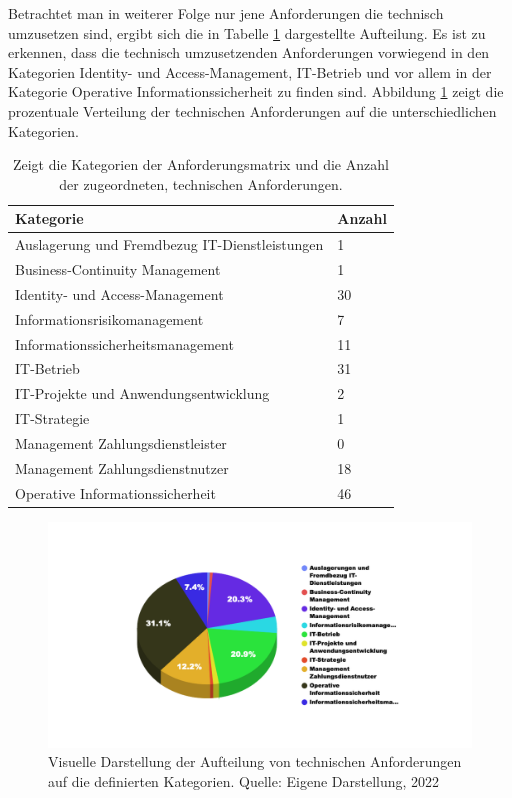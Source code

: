 \bigbreak
Betrachtet man in weiterer Folge nur jene Anforderungen die technisch umzusetzen sind, ergibt sich die in Tabelle \ref{table:kategorien_technisch} dargestellte Aufteilung. Es ist zu erkennen, dass die technisch umzusetzenden Anforderungen vorwiegend in den Kategorien \glqq{}Identity- und Access-Management\grqq{}, \glqq{}IT-Betrieb\grqq{} und vor allem in der Kategorie \glqq{}Operative Informationssicherheit\grqq{} zu finden sind. Abbildung \ref{fig:kategorien_technisch_aufteilung} zeigt die prozentuale Verteilung der technischen Anforderungen auf die unterschiedlichen Kategorien. 
\bigbreak
\begin{table}[H]
    \centering
    \caption{Zeigt die Kategorien der Anforderungsmatrix und die Anzahl der zugeordneten, technischen Anforderungen.} 
    \begin{tabular}{ll}
        \hline
        Kategorie & Anzahl\\
        \hline\hline
        Auslagerung und Fremdbezug IT-Dienstleistungen & 1\\
        Business-Continuity Management & 1\\
        Identity- und Access-Management & 30\\
        Informationsrisikomanagement & 7\\
        Informationssicherheitsmanagement & 11\\
        IT-Betrieb & 31\\
        IT-Projekte und Anwendungsentwicklung & 2\\
        IT-Strategie & 1\\
        Management Zahlungsdienstleister & 0\\
        Management Zahlungsdienstnutzer & 18\\
        Operative Informationssicherheit & 46\\
    \end{tabular}
    \label{table:kategorien_technisch}
\end{table}
\begin{figure}[H]
    \centering
  \includegraphics[width=\linewidth]{images/uploads/a_figure_04.png}
  \caption{Visuelle Darstellung der Aufteilung von technischen Anforderungen auf die definierten Kategorien. Quelle: Eigene Darstellung, 2022}
  \label{fig:kategorien_technisch_aufteilung}
\end{figure}
\bigbreak

